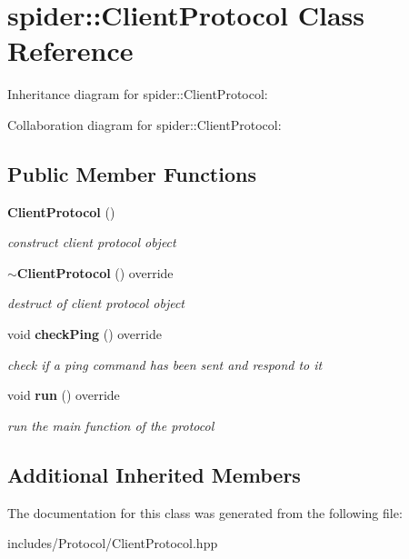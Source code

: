 \section{spider\+:\+:Client\+Protocol Class Reference}
\label{classspider_1_1_client_protocol}


Inheritance diagram for spider\+:\+:Client\+Protocol\+:


Collaboration diagram for spider\+:\+:Client\+Protocol\+:
\subsection*{Public Member Functions}
\begin{DoxyCompactItemize}
\item 
\mbox{\label{classspider_1_1_client_protocol_a99b5dc9ff233b3ef65ab3b6507ebc0b1}} 
\textbf{ Client\+Protocol} ()
\begin{DoxyCompactList}\small\item\em construct client protocol object \end{DoxyCompactList}\item 
\mbox{\label{classspider_1_1_client_protocol_abe6a83d162b5fbdd01b2a3e2bdca7d9b}} 
\textbf{ $\sim$\+Client\+Protocol} () override
\begin{DoxyCompactList}\small\item\em destruct of client protocol object \end{DoxyCompactList}\item 
\mbox{\label{classspider_1_1_client_protocol_a22ba498fcb876421408f36c8fdab88f2}} 
void \textbf{ check\+Ping} () override
\begin{DoxyCompactList}\small\item\em check if a ping command has been sent and respond to it \end{DoxyCompactList}\item 
\mbox{\label{classspider_1_1_client_protocol_a85f1850b7cfff1091984f8554308f5a4}} 
void \textbf{ run} () override
\begin{DoxyCompactList}\small\item\em run the main function of the protocol \end{DoxyCompactList}\end{DoxyCompactItemize}
\subsection*{Additional Inherited Members}


The documentation for this class was generated from the following file\+:\begin{DoxyCompactItemize}
\item 
includes/\+Protocol/Client\+Protocol.\+hpp\end{DoxyCompactItemize}
